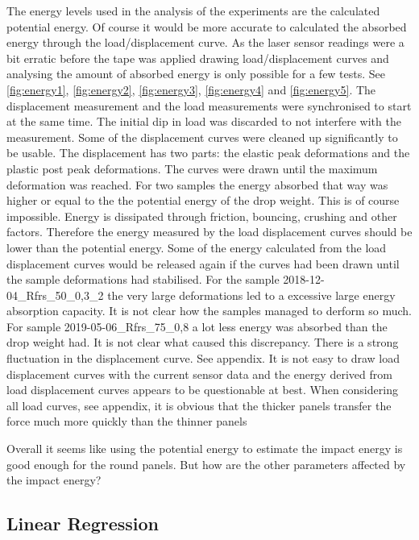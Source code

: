 The energy levels used in the analysis of the experiments are the calculated potential energy.
Of course it would be more accurate to calculated the absorbed energy through the load/displacement curve.
As the laser sensor readings were a bit erratic before the tape was applied drawing load/displacement curves and analysing the amount of absorbed energy is only possible for a few tests. 
See \autoref{fig:energy1}, \autoref{fig:energy2}, \autoref{fig:energy3}, \autoref{fig:energy4} and \autoref{fig:energy5}. 
The displacement measurement and the load measurements were synchronised to start at the same time. The initial dip in load was discarded to not interfere with the measurement. 
Some of the displacement curves were cleaned up significantly to be usable. 
The displacement has two parts: the elastic peak deformations and the plastic post peak deformations. 
The curves were drawn until the maximum deformation was reached. 
For two samples the energy absorbed that way was higher or equal to the the potential energy of the drop weight. 
This is of course impossible. 
Energy is dissipated through friction, bouncing, crushing and other factors. 
Therefore the energy measured by the load displacement curves should be lower than the potential energy. 
Some of the energy calculated from the load displacement curves would be released again if the curves had been drawn until the sample deformations had stabilised. 
For the sample 2018-12-04\_Rfrs\_50\_0,3\_2 the very large deformations led to a excessive large energy absorption capacity. It is not clear how the samples managed to derform so much.
For sample 2019-05-06\_Rfrs\_75\_0,8 a lot less energy was absorbed than the drop weight had. It is not clear what caused this discrepancy. There is a strong fluctuation in the displacement curve.
See appendix.
It is not easy to draw load displacement curves with the current sensor data and the energy derived from load displacement curves appears to be questionable at best.
When considering all load curves, see appendix, it is obvious that the thicker panels transfer the force much more quickly than the thinner panels

Overall it seems like using the potential energy to estimate the impact energy is good enough for the round panels. But how are the other parameters affected by the impact energy?



\subsection{Linear Regression}
\label{ssec:linear}

